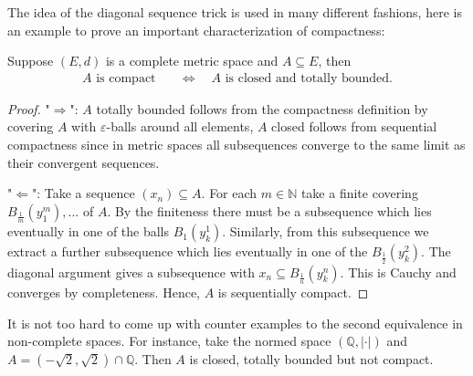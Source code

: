 The idea of the diagonal sequence trick is used in many different fashions, here is an example to prove an important characterization of compactness:
\begin{laussagewerkzeug}
\begin{prop}
	Suppose $(E,d)$ is a complete metric space and $A\subseteq E$, then
	\begin{align*}
		A\text{ is compact}\quad& \Longleftrightarrow \quad A\text{ is closed and totally bounded}.
	\end{align*} 
	\end{prop}
\end{laussagewerkzeug}
\begin{proof}[Proof]
"$\Rightarrow$": $A$ totally bounded follows from the compactness definition by covering $A$ with $\varepsilon$-balls around all elements, $A$ closed follows from sequential compactness since in metric spaces all subsequences converge to the same limit as their convergent sequences.\smallskip

"$\Leftarrow$": Take a sequence $(x_n) \subseteq A$. For each $m\in\mathbb{N}$ take a finite covering $B_{\frac{1}{m}}(y_1^m),...$ of $A$. By the finiteness there must be a subsequence which lies eventually in one of the balls $B_1(y_k^1)$. Similarly, from this subsequence we extract a further subsequence which lies eventually in one of the $B_{\frac{1}{2}}(y_k^2)$. The diagonal argument gives a subsequence with $x_n \subseteq B_{\frac{1}{n}}(y_k^n)$. This is Cauchy and converges by completeness. Hence, $A$ is sequentially compact.
\end{proof}
It is not too hard to come up with counter examples to the second equivalence in non-complete spaces. For instance, take the normed space $(\mathbb{Q},|\cdot| )$ and $A = (-\sqrt{2},\sqrt{2})\cap \mathbb{Q}$. Then $A$ is closed, totally bounded but not compact.\smallskip


